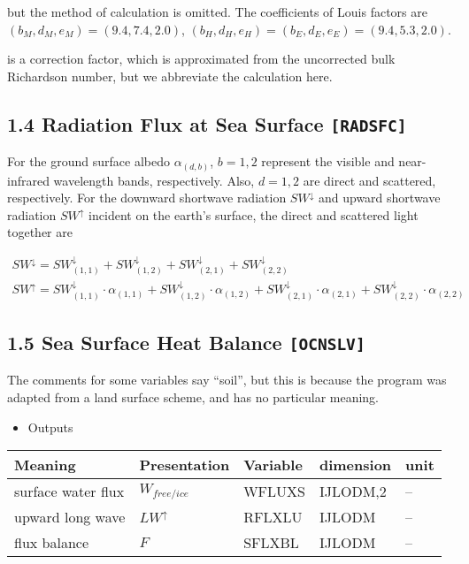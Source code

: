 but the method of calculation is omitted. The coefficients of Louis
factors are \(( b_M, d_M, e_M ) = ( 9.4, 7.4, 2.0 )\),
\(( b_H, d_H, e_H ) = ( b_E, d_E, e_E ) = ( 9.4, 5.3, 2.0 )\).

is a correction factor, which is approximated from the uncorrected bulk
Richardson number, but we abbreviate the calculation here.

\hypertarget{radiation-flux-at-sea-surface-radsfc}{%
\subsection{\texorpdfstring{1.4 Radiation Flux at Sea Surface
\texttt{{[}RADSFC{]}}}{1.4 Radiation Flux at Sea Surface {[}RADSFC{]}}}\label{radiation-flux-at-sea-surface-radsfc}}

For the ground surface albedo \(\alpha_{(d,b)}\), \(b=1,2\) represent
the visible and near-infrared wavelength bands, respectively. Also,
\(d=1,2\) are direct and scattered, respectively. For the downward
shortwave radiation \(SW^\downarrow\) and upward shortwave radiation
\(SW^\uparrow\) incident on the earth's surface, the direct and
scattered light together are

\begin{eqnarray}
    SW^\downarrow = SW^\downarrow_{(1,1)}+SW^\downarrow_{(1,2)}+SW^\downarrow_{(2,1)}+SW^\downarrow_{(2,2)} \\
SW^\uparrow = SW^\downarrow_{(1,1)}\cdot\alpha_{(1,1)}+SW^\downarrow_{(1,2)}\cdot\alpha_{(1,2)}+SW^\downarrow_{(2,1)}\cdot\alpha_{(2,1)}+SW^\downarrow_{(2,2)}\cdot\alpha_{(2,2)}
\end{eqnarray}

\hypertarget{sea-surface-heat-balance-ocnslv}{%
\subsection{\texorpdfstring{1.5 Sea Surface Heat Balance
\texttt{{[}OCNSLV{]}}}{1.5 Sea Surface Heat Balance {[}OCNSLV{]}}}\label{sea-surface-heat-balance-ocnslv}}

The comments for some variables say ``soil'', but this is because the
program was adapted from a land surface scheme, and has no particular
meaning.

\begin{itemize}
\tightlist
\item
  Outputs
\end{itemize}

\setlength\LTleft{0pt}\setlength\LTright{0pt}\begin{longtable}[]{@{}lllll@{}}
\toprule\relax
Meaning & Presentation & Variable & dimension & unit \\
\midrule\relax
\endhead
surface water flux & \(W_{free/ice}\) & WFLUXS & IJLODM,2 & -- \\
upward long wave & \(LW^\uparrow\) & RFLXLU & IJLODM & -- \\
flux balance & \(F\) & SFLXBL & IJLODM & -- \\
\bottomrule
\end{longtable}

